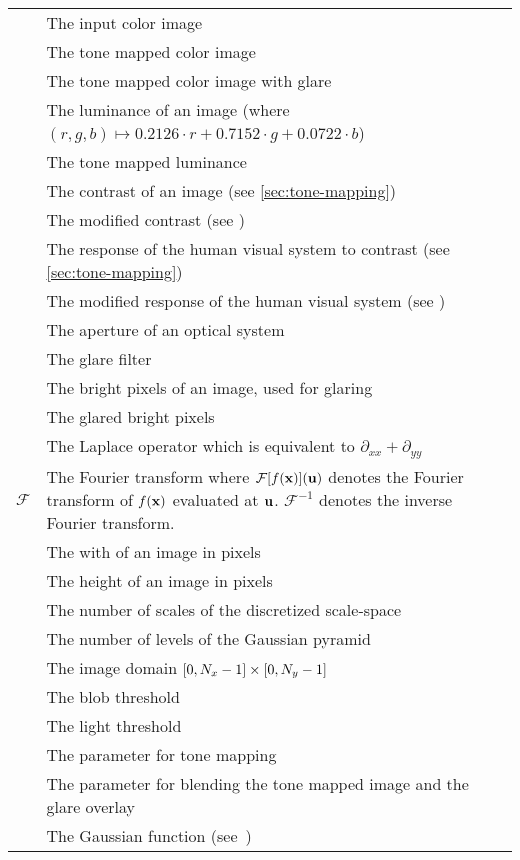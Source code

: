 \begin{tabular}{c p{}}
	\image & The input color image \\ 
	\tonemappedimage & The tone mapped color image \\ 
	\finalimage & The tone mapped color image with glare \\
	\luminance & The luminance of an image (where $(r, g, b) \mapsto 0.2126 \cdot r + 0.7152 \cdot g + 0.0722 \cdot b$)  \\
	\tonemappedluminance & The tone mapped luminance \\
	\contrast & The contrast of an image (see \cref{sec:tone-mapping}) \\
	\modifiedcontrast & The modified contrast (see \contrast) \\
	\response & The response of the human visual system to contrast (see \cref{sec:tone-mapping}) \\
	\modifiedresponse & The modified response of the human visual system (see \response) \\
	\aperture & The aperture of an optical system \\
	\psf & The glare filter \\
	\overlay & The bright pixels of an image, used for glaring \\
	\glareoverlay & The glared bright pixels \\
	
	\laplace & The Laplace operator which is equivalent to $\partial_{xx} + \partial_{yy}$ \\
	$\mathcal{F}$ & The Fourier transform where $\mathcal{F}[f(\mathbf{x})](\mathbf{u})$ denotes the Fourier transform of $f(\mathbf{x})$ evaluated at $\mathbf{u}$.
	$\mathcal{F}^{-1}$ denotes the inverse Fourier transform. \\
	
	\imagewidth & The with of an image in pixels \\
	\imageheight & The height of an image in pixels \\
	\numscales & The number of scales of the discretized scale\hyp{}space \\
	\numgauss & The number of levels of the Gaussian pyramid \\
	\imagedomain & The image domain $[0, N_x-1] \times [0, N_y-1]$ \\
	
	\blobthreshold & The blob threshold \\
	\lightthreshold & The light threshold \\
	
	\parametertonemapping & The parameter for tone mapping \\
	\parameterblending & The parameter for blending the tone mapped image and the glare overlay \\
	
	\gaussian & The Gaussian function (see~\Cref{eq:gaussian}) \\
\end{tabular} 

